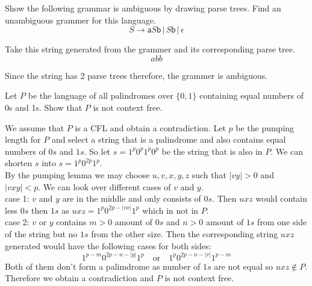 \documentclass[12pt]{exam}
\begin{document}
\begin{questions}
  \question{}
  Show the following grammar is ambiguous by drawing parse trees. Find an unambiguous grammer for this language.
  \[S\to \mathsf{a}S\mathsf{b}\,|\, S\mathsf{b}\,|\,\epsilon\]

  \begin{solution}

    Take this string generated from the grammer and its corresponding parse tree.
    \[abb\]


    Since the string has 2 parse trees therefore, the grammer is ambiguous.


  \end{solution}


  \question{}
  Let $P$ be the language of all palindromes over $\{0,1\}$ containing equal numbers of 0s and 1s. Show that $P$ is not context free.

  \begin{solution}
    We assume that $P$ is a CFL and obtain a contradiction. Let $p$ be the pumping length for $P$ and select a string that is a palindrome and also contains equal numbers of $0s$ and $1s$. So let $s = 1^{p}0^{p}1^{p}0^{p}$ be the string that is also in $P$. We can shorten $s$ into $s = 1^{p}0^{2p}1^{p}$.\\
    By the pumping lemma we may choose $u, v, x, y, z$ such that $|vy| > 0$ and $|vxy| < p$. We can look over different cases of $v$ and $y$.\\
    case 1: $v$ and $y$ are in the middle and only consists of $0s$. Then $uxz$ would contain less $0s$ then $1s$ as $uxz = 1^{p}0^{2p-|vx|}1^{p}$ which in not in $P$.\\
    case 2: $v$ or $y$ contains $m>0$ amount of $0s$ and $n>0$ amount of $1s$ from one side of the string but no $1s$ from the other size. Then the corresponding string $uxz$ generated would have the following cases for both sides:\\
    \[1^{p-m}0^{2p-n-|y|}1^{p}\quad \text{or} \quad 1^{p}0^{2p-n-|v|}1^{p-m}\]
    Both of them don't form a palimdrome as number of $1s$ are not equal so $uxz \notin P$. Therefore we obtain a contradiction and $P$ is not context free.
  \end{solution}



\end{questions}
\end{document}
